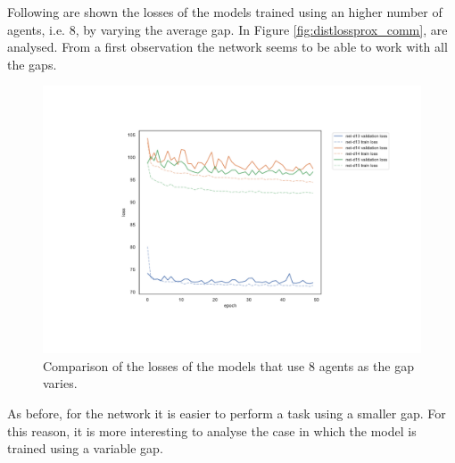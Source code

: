 Following are shown the losses of the models trained using an higher number of 
agents, i.e. 8, by varying the average gap.
In Figure \ref{fig:distlossprox_comm}, are analysed. From a first observation 
the network seems to be able to work with all the gaps.
\begin{figure}[!htb]
	\centering
	\includegraphics[width=.75\textwidth]{contents/images/task1-extension/loss-distributed-n8@}%
	\caption{Comparison of the losses of the models that use $8$ agents as 
	the gap 
	varies.}
	\label{fig:distlossn8}
\end{figure}
As before, for the network it is easier to perform a task using a smaller gap.
For this reason, it is more interesting to analyse the case in which the model 
is trained using a variable gap.

